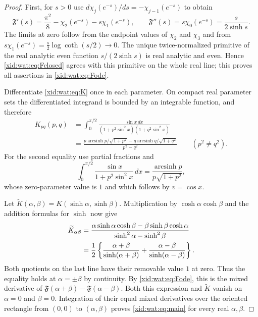 \begin{proof}
First, for $s>0$ use
$d\chi_j(e^{-s})/ds=-\chi_{j-1}(e^{-s})$ to obtain
\[
 \mathfrak F'(s)=\frac{\pi^2}{8}
              -\chi_2(e^{-s})-s\chi_1(e^{-s}),
 \qquad
 \mathfrak F''(s)=s\chi_0(e^{-s})
                =\frac{s}{2\sinh s}.
\]
The limits at zero follow from the endpoint values of $\chi_2$ and
$\chi_3$ and from
$s\chi_1(e^{-s})=\tfrac{s}{2}\log\coth(s/2)\to0$.
The unique twice-normalized primitive of the real analytic even
function $s/(2\sinh s)$ is real analytic and even. Hence
\eqref{xid:wat:eq:Fclosed} agrees with this primitive on the whole real
line; this proves all assertions in \eqref{xid:wat:eq:Fode}.

Differentiate \eqref{xid:wat:eq:K} once in each parameter. On compact
real parameter sets the differentiated integrand is bounded by an
integrable function, and therefore
\begin{align*}
 K_{pq}(p,q)
 &=\int_0^{\pi/2}
       \frac{\sin x\,dx}
       {(1+p^2\sin^2x)(1+q^2\sin^2x)}\\
 &=\frac{p\operatorname{arcsinh}p/\sqrt{1+p^2}
       -q\operatorname{arcsinh}q/\sqrt{1+q^2}}{p^2-q^2}
       \qquad(p^2\ne q^2).
\end{align*}
For the second equality use partial fractions and
\[
 \int_0^{\pi/2}\frac{\sin x}{1+p^2\sin^2x}\,dx
       =\frac{\operatorname{arcsinh}p}{p\sqrt{1+p^2}},
\]
whose zero-parameter value is $1$ and which follows by
$v=\cos x$.

Let $\widetilde K(\alpha,\beta)=K(\sinh\alpha,\sinh\beta)$.
Multiplication by $\cosh\alpha\cosh\beta$ and the addition formulas
for $\sinh$ now give
\begin{align}\label{xid:wat:eq:hyperbolicmixed}
 \widetilde K_{\alpha\beta}
 &=\frac{\alpha\sinh\alpha\cosh\beta
        -\beta\sinh\beta\cosh\alpha}
       {\sinh^2\alpha-\sinh^2\beta}\notag\\
 &=\frac12\left\{
      \frac{\alpha+\beta}{\sinh(\alpha+\beta)}
     +\frac{\alpha-\beta}{\sinh(\alpha-\beta)}\right\}.
\end{align}
Both quotients on the last line have their removable value $1$ at
zero. Thus the equality holds at $\alpha=\pm\beta$ by continuity.
By \eqref{xid:wat:eq:Fode}, this is the mixed derivative of
$\mathfrak F(\alpha+\beta)-\mathfrak F(\alpha-\beta)$.
Both this expression and $\widetilde K$ vanish on $\alpha=0$ and
$\beta=0$. Integration of their equal mixed derivatives over the
oriented rectangle from $(0,0)$ to $(\alpha,\beta)$ proves
\eqref{xid:wat:eq:main} for every real $\alpha,\beta$.
\end{proof}

